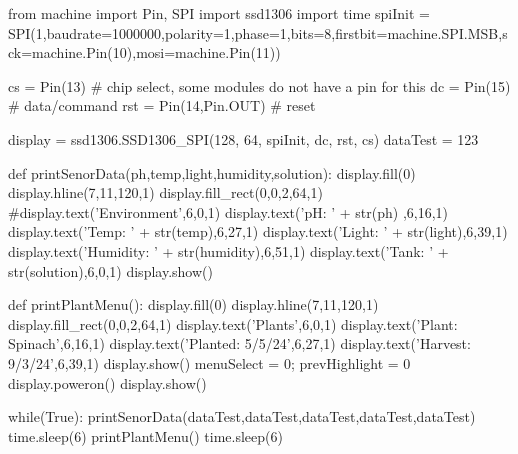 \documentclass[12pt]{article} %
\begin{document}
\begin{pythoncode}[caption={Main MicroPython Code}]
from machine import Pin, SPI
import ssd1306
import time
spiInit = SPI(1,baudrate=1000000,polarity=1,phase=1,bits=8,firstbit=machine.SPI.MSB,sck=machine.Pin(10),mosi=machine.Pin(11))

cs = Pin(13)   # chip select, some modules do not have a pin for this
dc = Pin(15)    # data/command
rst = Pin(14,Pin.OUT)   # reset

display = ssd1306.SSD1306_SPI(128, 64, spiInit, dc, rst, cs)
dataTest = 123
    
def printSenorData(ph,temp,light,humidity,solution):
    display.fill(0)
    display.hline(7,11,120,1)
    display.fill_rect(0,0,2,64,1)
    #display.text('Environment',6,0,1)
    display.text('pH: '       + str(ph) ,6,16,1)
    display.text('Temp: '     + str(temp),6,27,1)
    display.text('Light: '    + str(light),6,39,1)
    display.text('Humidity: ' + str(humidity),6,51,1)
    display.text('Tank: ' +  str(solution),6,0,1)    
    display.show()

def printPlantMenu():
    display.fill(0)
    display.hline(7,11,120,1)
    display.fill_rect(0,0,2,64,1)
    display.text('Plants',6,0,1)
    display.text('Plant: Spinach',6,16,1)
    display.text('Planted: 5/5/24',6,27,1)
    display.text('Harvest: 9/3/24',6,39,1)
    display.show()
menuSelect = 0;
prevHighlight = 0
display.poweron()
display.show()

while(True):
    printSenorData(dataTest,dataTest,dataTest,dataTest,dataTest)
    time.sleep(6)
    printPlantMenu()
    time.sleep(6)

\end{pythoncode}
\end{document}
